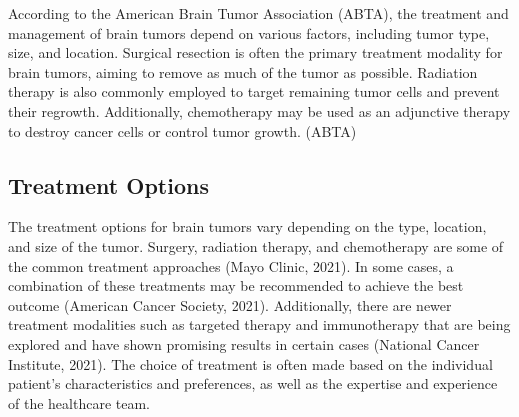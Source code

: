 \documentclass[12pt,oneside]{report}
\begin{document}
\begin{enumerate}
\begin{enumerate}
According to the American Brain Tumor Association (ABTA), the treatment and management of brain tumors depend on various factors, including tumor type, size, and location. Surgical resection is often the primary treatment modality for brain tumors, aiming to remove as much of the tumor as possible. Radiation therapy is also commonly employed to target remaining tumor cells and prevent their regrowth. Additionally, chemotherapy may be used as an adjunctive therapy to destroy cancer cells or control tumor growth. (ABTA)

\end{enumerate}

\end{enumerate}

\subsection{Treatment Options}
The treatment options for brain tumors vary depending on the type, location, and size of the tumor. Surgery, radiation therapy, and chemotherapy are some of the common treatment approaches (Mayo Clinic, 2021). In some cases, a combination of these treatments may be recommended to achieve the best outcome (American Cancer Society, 2021). Additionally, there are newer treatment modalities such as targeted therapy and immunotherapy that are being explored and have shown promising results in certain cases (National Cancer Institute, 2021). The choice of treatment is often made based on the individual patient's characteristics and preferences, as well as the expertise and experience of the healthcare team.
\end{document}

